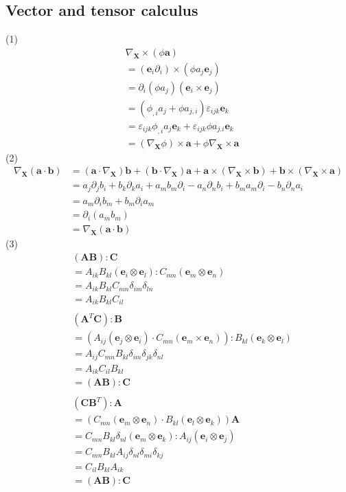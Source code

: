 \documentclass{elsarticle}
\begin{document}
\subsection{Vector and tensor calculus}
(1) 
\begin{align*}
    &\nabla_{\bm{X}}\times(\phi\bm{a})\\
    &=(\bm{e}_i\partial_i)\times(\phi a_j\bm{e}_j)\\
    &=\partial_i(\phi a_j)(\bm{e}_i\times\bm{e}_j)\\
    &=(\phi_{,i}a_j+\phi a_{j,i})\varepsilon_{ijk}\bm{e}_k\\
    &=\varepsilon_{ijk}\phi_{,i}a_j\bm{e}_k+\varepsilon_{ijk}\phi a_{j.i}\bm{e}_k\\
    &=(\nabla_{\bm{X}}\phi)\times\bm{a}+\phi\nabla_{\bm{X}}\times\bm{a}
\end{align*}
(2)
\begin{align*}
    \nabla_{\bm{X}}(\bm{a}\cdot\bm{b})&=(\bm{a}\cdot\nabla_{\bm{X}})\bm{b}+(\bm{b}\cdot\nabla_{\bm{X}})\bm{a}+\bm{a}\times(\nabla_{\bm{X}}\times\bm{b})+\bm{b}\times(\nabla_{\bm{X}}\times\bm{a})\\
    &=a_j\partial_jb_i+b_k\partial_ka_i+a_mb_m\partial_i-a_n\partial_nb_i+b_ma_m\partial_i-b_n\partial_na_i\\
    &=a_m\partial_ib_m + b_m\partial_ia_m\\
    &=\partial_i(a_m b_m)\\
    &=\nabla_{\bm{X}}(\bm{a}\cdot\bm{b})
\end{align*}
(3)
\begin{align*}
    &(\mathbf{A}\mathbf{B})\mathbf{:}\mathbf{C}\\
    &=A_{ik}B_{kl}(\bm{e}_i\otimes\bm{e}_l)\mathbf{:}C_{mn}(\bm{e}_m\otimes\bm{e}_n)\\
    &=A_{ik}B_{kl}C_{mn}\delta_{im}\delta_{ln}\\
    &=A_{ik}B_{kl}C_{il}\\
    &\\
    &(\mathbf{A}^T\mathbf{C})\mathbf{:}\mathbf{B}\\
    &=(A_{ij}(\bm{e}_j\otimes\bm{e}_i)\cdot C_{mn}(\bm{e}_m\times\bm{e}_n))\mathbf{:}B_{kl}(\bm{e}_k\otimes\bm{e}_l)\\
    &=A_{ij}C_{mn}B_{kl}\delta_{im}\delta_{jk}\delta_{nl}\\
    &=A_{ik}C_{il}B_{kl}\\
    &=(\mathbf{A}\mathbf{B})\mathbf{:}\mathbf{C}\\
    &\\
    &(\mathbf{C}\mathbf{B}^T)\mathbf{:}\mathbf{A}\\
    &=(C_{mn}(\bm{e}_m\otimes\bm{e}_n)\cdot B_{kl}(\bm{e}_l\otimes\bm{e}_k))\mathbf{A}\\
    &=C_{mn}B_{kl}\delta_{nl}(\bm{e}_m\otimes\bm{e}_k)\mathbf{:}A_{ij}(\bm{e}_i\otimes\bm{e}_j)\\
    &=C_{mn}B_{kl}A_{ij}\delta_{nl}\delta_{mi}\delta_{kj}\\
    &=C_{il}B_{kl}A_{ik}\\
    &=(\mathbf{A}\mathbf{B})\mathbf{:}\mathbf{C}
\end{align*}
\end{document}
